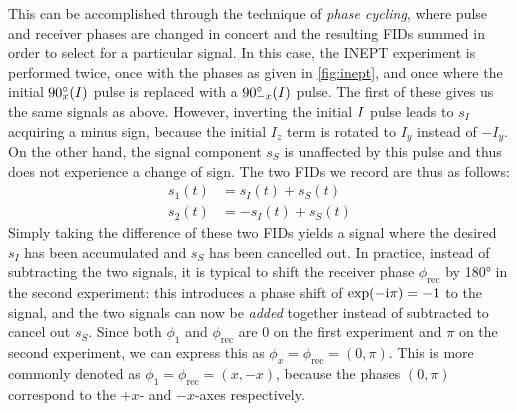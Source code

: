 This can be accomplished through the technique of \textit{phase cycling}, where pulse and receiver phases are changed in concert and the resulting FIDs summed in order to select for a particular signal.
In this case, the INEPT experiment is performed twice, once with the phases as given in \cref{fig:inept}, and once where the initial $\angang{90}{x}(I)$ pulse is replaced with a $\angang{90}{-x}(I)$ pulse.
The first of these gives us the same signals as above.
However, inverting the initial $I\/$ pulse leads to $s_I$ acquiring a minus sign, because the initial $I_z$ term is rotated to $I_y$ instead of $-I_y$.
On the other hand, the signal component $s_S$ is unaffected by this pulse and thus does not experience a change of sign.
The two FIDs we record are thus as follows:
\begin{align}
    \label{eq:inept_phase_cycling}
    s_1(t) &= s_I(t) + s_S(t) \\
    s_2(t) &= -s_I(t) + s_S(t)
\end{align}
Simply taking the difference of these two FIDs yields a signal where the desired $s_I$ has been accumulated and $s_S$ has been cancelled out.
In practice, instead of subtracting the two signals, it is typical to shift the receiver phase $\phi_\text{rec}$ by \ang{180} in the second experiment: this introduces a phase shift of $\exp(-\mathrm{i}\pi) = -1$ to the signal, and the two signals can now be \textit{added} together instead of subtracted to cancel out $s_S$.
Since both $\phi_1$ and $\phi_\text{rec}$ are $0$ on the first experiment and $\pi$ on the second experiment, we can express this as $\phi_x = \phi_\text{rec} = (0, \pi)$.
This is more commonly denoted as $\phi_1 = \phi_\text{rec} = (x, -x)$, because the phases $(0, \pi)$ correspond to the $+x$- and $-x$-axes respectively.

